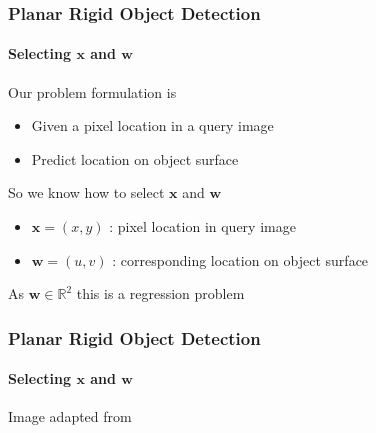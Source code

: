 \documentclass[xetex,professionalfont]{beamer}
\newcommand{\RR}{\mathbb{R}}
\renewcommand{\vec}[1]{\ensuremath{\mathbf{#1}}}
\newcommand{\vw}{\vec{w}}
\newcommand{\vx}{\vec{x}}
\renewcommand\emph[1]{\textcolor{tuwcvl_inf_red}{#1}}
\begin{document}
\begin{frame}
\frametitle{Planar Rigid Object Detection}
\framesubtitle{Selecting $\vx$ and $\vw$}

Our problem formulation is  %
\begin{itemize}
	\item Given a pixel location in a query image
	\item Predict location on object surface  %
\end{itemize}

\bigskip
So we know how to select $\vx$ and $\vw$
\begin{itemize}
	\item $\vx=(x,y)$ : pixel location in query image
	\item $\vw=(u,v)$ : corresponding location on object surface
\end{itemize}

\bigskip
As $\vw\in\RR^2$ this is a \emph{regression problem}

\end{frame}


\begin{frame}
\frametitle{Planar Rigid Object Detection}
\framesubtitle{Selecting $\vx$ and $\vw$}

\begin{center}
    {\centering Image adapted from \cite{prince12}}
\end{center}

\end{frame}

\end{document}
